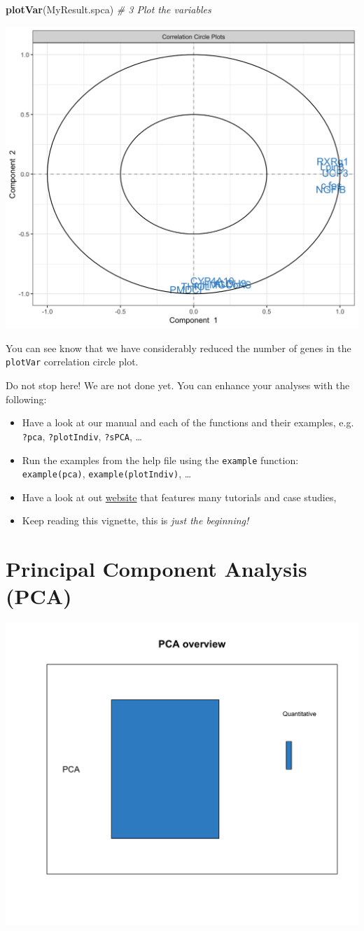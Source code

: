 \documentclass[]{book}
\newenvironment{Shaded}{\begin{snugshade}}{\end{snugshade}}
\newcommand{\KeywordTok}[1]{\textcolor[rgb]{0.13,0.29,0.53}{\textbf{#1}}}
\newcommand{\CommentTok}[1]{\textcolor[rgb]{0.56,0.35,0.01}{\textit{#1}}}
\newcommand{\NormalTok}[1]{#1}
\theoremstyle{definition}
\theoremstyle{definition}
\theoremstyle{definition}
\theoremstyle{remark}
\begin{document}
\begin{Shaded}
\begin{Highlighting}[]
\KeywordTok{plotVar}\NormalTok{(MyResult.spca)                 }\CommentTok{# 3 Plot the variables}
\end{Highlighting}
\end{Shaded}

\begin{center}\includegraphics[width=0.5\linewidth]{Figures/unnamed-chunk-6-2} \end{center}

You can see know that we have considerably reduced the number of genes
in the \texttt{plotVar} correlation circle plot.

Do not stop here! We are not done yet. You can enhance your analyses
with the following:

\begin{itemize}
\item
  Have a look at our manual and each of the functions and their
  examples, e.g. \texttt{?pca}, \texttt{?plotIndiv}, \texttt{?sPCA},
  \ldots{}
\item
  Run the examples from the help file using the \texttt{example}
  function: \texttt{example(pca)}, \texttt{example(plotIndiv)}, \ldots{}
\item
  Have a look at out \href{http://www.mixomics.org}{website} that
  features many tutorials and case studies,
\item
  Keep reading this vignette, this is \emph{just the beginning!}
\end{itemize}

\chapter{Principal Component Analysis (PCA)}\label{pca}

\begin{center}\includegraphics[width=0.5\linewidth]{Figures/overview-PCA-1} \end{center}
\end{document}
